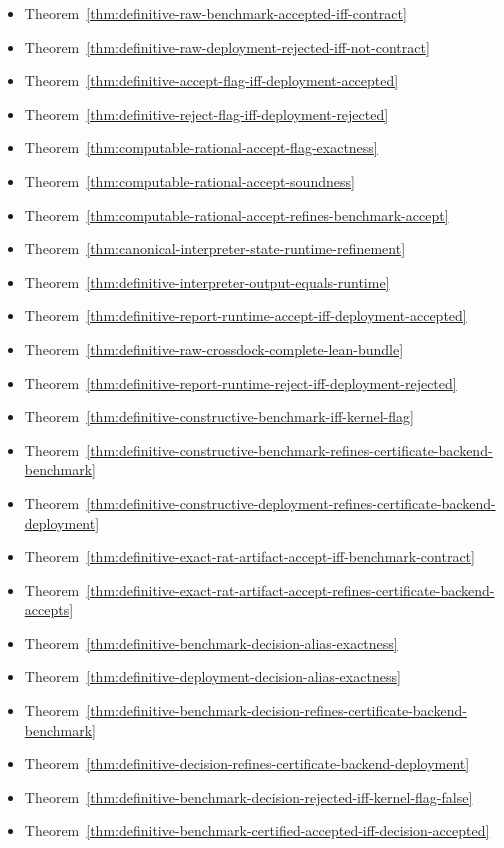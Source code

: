 \begin{itemize}
\item Theorem~\ref{thm:definitive-raw-benchmark-accepted-iff-contract}
\item Theorem~\ref{thm:definitive-raw-deployment-rejected-iff-not-contract}
\item Theorem~\ref{thm:definitive-accept-flag-iff-deployment-accepted}
\item Theorem~\ref{thm:definitive-reject-flag-iff-deployment-rejected}
\item Theorem~\ref{thm:computable-rational-accept-flag-exactness}
\item Theorem~\ref{thm:computable-rational-accept-soundness}
\item Theorem~\ref{thm:computable-rational-accept-refines-benchmark-accept}
\item Theorem~\ref{thm:canonical-interpreter-state-runtime-refinement}
\item Theorem~\ref{thm:definitive-interpreter-output-equals-runtime}
\item Theorem~\ref{thm:definitive-report-runtime-accept-iff-deployment-accepted}
\item Theorem~\ref{thm:definitive-raw-crossdock-complete-lean-bundle}
\item Theorem~\ref{thm:definitive-report-runtime-reject-iff-deployment-rejected}
\item Theorem~\ref{thm:definitive-constructive-benchmark-iff-kernel-flag}
\item Theorem~\ref{thm:definitive-constructive-benchmark-refines-certificate-backend-benchmark}
\item Theorem~\ref{thm:definitive-constructive-deployment-refines-certificate-backend-deployment}
\item Theorem~\ref{thm:definitive-exact-rat-artifact-accept-iff-benchmark-contract}
\item Theorem~\ref{thm:definitive-exact-rat-artifact-accept-refines-certificate-backend-accepts}
\item Theorem~\ref{thm:definitive-benchmark-decision-alias-exactness}
\item Theorem~\ref{thm:definitive-deployment-decision-alias-exactness}
\item Theorem~\ref{thm:definitive-benchmark-decision-refines-certificate-backend-benchmark}
\item Theorem~\ref{thm:definitive-decision-refines-certificate-backend-deployment}
\item Theorem~\ref{thm:definitive-benchmark-decision-rejected-iff-kernel-flag-false}
\item Theorem~\ref{thm:definitive-benchmark-certified-accepted-iff-decision-accepted}

\end{itemize}
